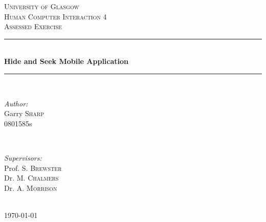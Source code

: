 \documentclass[12pt]{article} %
\begin{document}

\begin{titlepage}

\newcommand{\HRule}{\rule{\linewidth}{0.5mm}} %

\center %

\textsc{\LARGE University of Glasgow}\\[1.5cm] %
\textsc{\Large Human Computer Interaction 4}\\[0.5cm] %
\textsc{\large Assessed Exercise}\\[0.5cm] %

\HRule \\[0.4cm]
{ \huge \bfseries Hide and Seek Mobile Application}\\[0.4cm] %
\HRule \\[1.5cm]

\begin{minipage}{0.4\textwidth}
\begin{flushleft} \large
\emph{Author:}\\
Garry \textsc{Sharp}\\
0801585s\\ %
\end{flushleft}
\end{minipage}
~
\begin{minipage}{0.4\textwidth}
\begin{flushright} \large
\emph{Supervisors:} \\
Prof. S. \textsc{Brewster}\\ %
Dr. M. \textsc{Chalmers}\\ %
Dr. A. \textsc{Morrison}\\ %
\end{flushright}
\end{minipage}\\[4cm]

{\large \today}\\[3cm] %


\vfill %

\end{titlepage}
\end{document}

